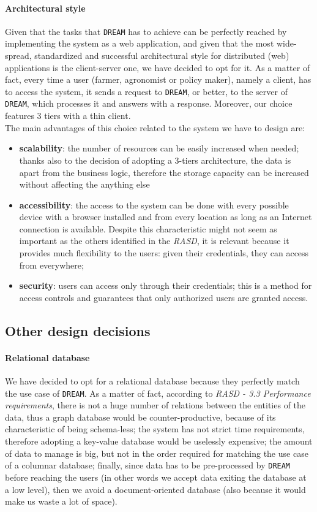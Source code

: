 \documentclass{article}
\begin{document}
\paragraph{Architectural style}\label{Architectural style}
Given that the tasks that \verb|DREAM| has to achieve can be perfectly reached by implementing the system as a web application, and given that the most wide-spread, standardized and successful architectural style for distributed (web) applications is the client-server one, we have decided to opt for it. As a matter of fact, every time a user (farmer, agronomist or policy maker), namely a client, has to access the system, it sends a request to \verb|DREAM|, or better, to the server of \verb|DREAM|, which processes it and answers with a response. Moreover, our choice features 3 tiers with a thin client.\\
The main advantages of this choice related to the system we have to design are:
\begin{itemize}
    \item \textbf{scalability}: the number of resources can be easily increased when needed; thanks also to the decision of adopting a 3-tiers architecture, the data is apart from the business logic, therefore the storage capacity can be increased without affecting the anything else
    \item \textbf{accessibility}: the access to the system can be done with every possible device with a browser installed and from every location as long as an Internet connection is available. Despite this characteristic might not seem as important as the others identified in the \textit{RASD}, it is relevant because it provides much flexibility to the users: given their credentials, they can access from everywhere;
    \item \textbf{security}: users can access only through their credentials; this is a method for access controls and guarantees that only authorized users are granted access.
\end{itemize}
\subsection{Other design decisions}
\paragraph{Relational database}
We have decided to opt for a relational database because they perfectly match the use case of \verb|DREAM|. As a matter of fact, according to \textit{RASD - 3.3 Performance requirements}, there is not a huge number of relations between the entities of the data, thus a graph database would be counter-productive, because of its characteristic of being schema-less; the system has not strict time requirements, therefore adopting a key-value database would be uselessly expensive; the amount of data to manage is big, but not in the order required for matching the use case of a columnar database; finally, since data has to be pre-processed by \verb|DREAM| before reaching the users (in other words we accept data exiting the database at a low level), then we avoid a document-oriented database (also because it would make us waste a lot of space).
\end{document}
